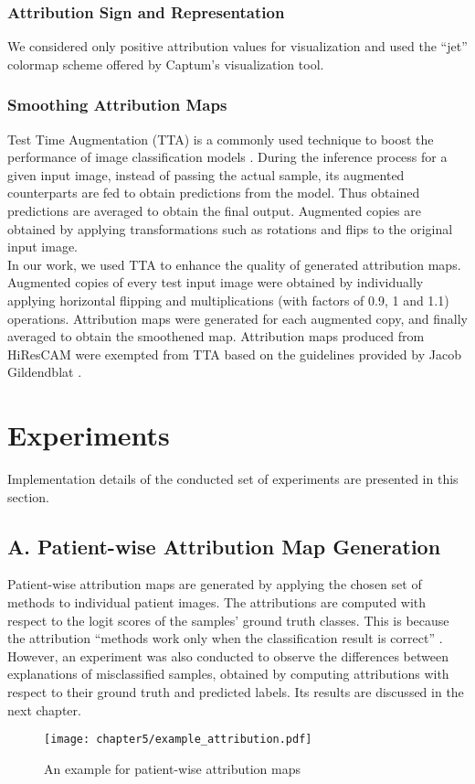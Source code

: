 \documentclass[../report.tex]{subfiles}
\begin{document}
	\subsubsection{Attribution Sign and Representation}
	We considered only positive attribution values for visualization and used the \enquote{jet} colormap scheme offered by Captum's \cite{kokhlikyan2020captum} visualization tool.
	\subsubsection{Smoothing Attribution Maps}
	Test Time Augmentation (TTA) is a commonly used technique to boost the performance of image classification models \cite{simonyan2014very}. During the inference process for a given input image, instead of passing the actual sample, its augmented counterparts are fed to obtain predictions from the model. Thus obtained predictions are averaged to obtain the final output. Augmented copies are obtained by applying transformations such as rotations and flips to the original input image.\\
	In our work, we used TTA to enhance the quality of generated attribution maps. Augmented copies of every test input image were obtained by individually applying horizontal flipping and multiplications (with factors of 0.9, 1 and 1.1) operations. Attribution maps were generated for each augmented copy, and finally averaged to obtain the smoothened map. Attribution maps produced from HiResCAM were exempted from TTA based on the guidelines provided by Jacob Gildendblat \cite{jacobgilpytorchcam}.
	
    \section{Experiments}
    Implementation details of the conducted set of experiments are presented in this section.
    \subsection{A. Patient-wise Attribution Map Generation}
    Patient-wise attribution maps are generated by applying the chosen set of methods to individual patient images. The attributions are computed with respect to the logit scores of the samples' ground truth classes. This is because the attribution \enquote{methods work only when the classification result is correct} \cite{muhammad2020eigen}. However, an experiment was also conducted to observe the differences between explanations of misclassified samples, obtained by computing attributions with respect to their ground truth and predicted labels. Its results are discussed in the next chapter.
    \begin{figure}[H]
    	\hspace*{0cm}      
    	\texttt{[image: chapter5/example\_attribution.pdf]}
    	\caption{An example for patient-wise attribution maps}
    	\label{fig_gm_pipeline}
    \end{figure}
\end{document}
